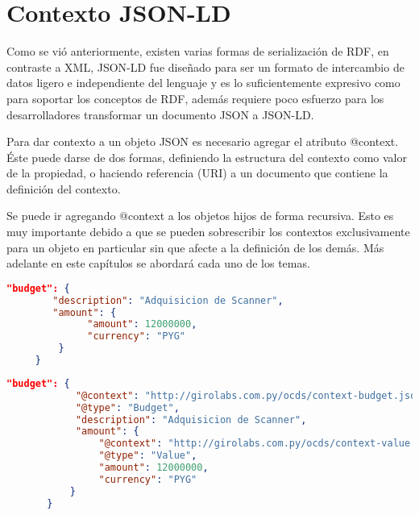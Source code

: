 \section{Contexto JSON-LD}

Como se vió anteriormente, existen varias formas de serialización de RDF, en contraste a XML, JSON-LD fue diseñado para ser un formato de intercambio de datos ligero e independiente del lenguaje y es lo suficientemente expresivo como para soportar los conceptos de RDF, además requiere poco esfuerzo para los desarrolladores transformar un documento JSON a JSON-LD. 

Para dar contexto a un objeto JSON es necesario agregar el atributo @context. Éste puede darse de dos formas, definiendo la estructura del contexto como valor de la propiedad, o haciendo referencia (URI) a un documento que contiene la definición del contexto.

Se puede ir agregando @context a los objetos hijos de forma recursiva. Esto es muy importante debido a que se pueden sobrescribir los contextos exclusivamente para un objeto en particular sin que afecte a la definición de los demás. Más adelante en este capítulos se abordará cada uno de los temas.


\begin{lstlisting}[language=json,firstnumber=1]
    "budget": {
        "description": "Adquisicion de Scanner",
        "amount": {
              "amount": 12000000,
              "currency": "PYG"
         }
     }  
    \end{lstlisting}


    \begin{lstlisting}[language=json,firstnumber=1]
        "budget": {
            "@context": "http://girolabs.com.py/ocds/context-budget.json",
            "@type": "Budget",
            "description": "Adquisicion de Scanner",
            "amount": {
                "@context": "http://girolabs.com.py/ocds/context-value.json",
                "@type": "Value",
                "amount": 12000000,
                "currency": "PYG"
           }
       }   
        \end{lstlisting}
    
 